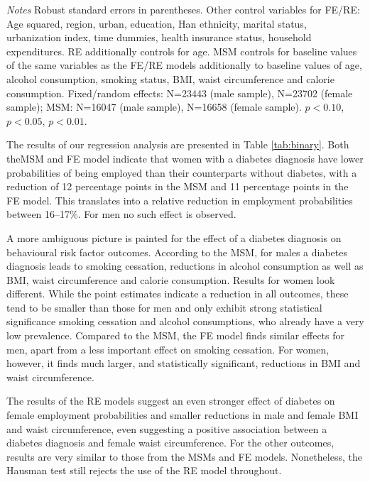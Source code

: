 \begin{table}[p]
\begin{adjustbox}{max width=\linewidth, center}
\begin{threeparttable}
{\begin{tabular}{l*{6}{S
S}}
\bottomrule
\end{tabular}
\begin{tablenotes}
\item \textit{Notes} Robust standard errors in parentheses. Other control variables for FE/RE: Age squared, region, urban, education, Han ethnicity, marital status, urbanization index, time dummies, health insurance status, household expenditures. RE additionally controls for age. MSM controls for baseline values of the same variables as the FE/RE models additionally to baseline values of age, alcohol consumption, smoking status, BMI, waist circumference and calorie consumption.  Fixed/random effects: N=23443 (male sample), N=23702 (female sample); MSM:  N=16047 (male sample), N=16658 (female sample). \sym{*} \(p<0.10\), \sym{**} \(p<0.05\), \sym{***} \(p<0.01\).
\end{tablenotes}
}
\end{threeparttable}
\end{adjustbox}

\end{table}
The results of our regression analysis are presented in Table \ref{tab:binary}. Both the\ac{MSM} and \ac{FE} model indicate that women with a diabetes diagnosis have lower probabilities of being employed than their counterparts without diabetes, with a reduction of 12 percentage points in the \ac{MSM} and 11 percentage points in the \ac{FE} model. This translates into a relative reduction in employment probabilities between 16--17\%. For men no such effect is observed.



A more ambiguous picture is painted for the effect of a diabetes diagnosis on behavioural risk factor outcomes. According to the \ac{MSM}, for males a diabetes diagnosis leads to smoking cessation, reductions in alcohol consumption as well as \ac{BMI}, waist circumference and calorie consumption. Results for women look different. While the point estimates indicate a reduction in all outcomes, these tend to be smaller than those for men and only exhibit strong statistical significance smoking cessation and alcohol consumptions, who already have a very low prevalence. Compared to the \ac{MSM}, the \ac{FE} model finds similar effects for men, apart from a less important effect on smoking cessation.	For women, however, it finds much larger, and statistically significant, reductions in \ac{BMI} and waist circumference. 

The results of the \ac{RE} models suggest an even stronger effect of diabetes on female employment probabilities and  smaller reductions in male and female \ac{BMI} and waist circumference, even suggesting a positive association between a diabetes diagnosis and female waist circumference. For the other outcomes, results are very similar to those from the \acp{MSM} and \ac{FE} models. Nonetheless, the Hausman test still rejects the use of the \ac{RE} model throughout.

